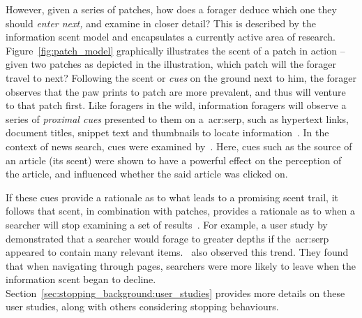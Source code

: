 However, given a series of patches, how does a forager deduce which one they should \emph{enter next,} and examine in closer detail? This is described by the information scent model and encapsulates a currently active area of research. Figure~\ref{fig:patch_model} graphically illustrates the scent of a patch in action -- given two patches as depicted in the illustration, which patch will the forager travel to next? Following the scent or \emph{cues} on the ground next to him, the forager observes that the paw prints to patch  are more prevalent, and thus will venture to that patch first. Like foragers in the wild, information foragers will observe a series of \emph{proximal cues} presented to them on a~\gls{acr:serp}, such as hypertext links, document titles, snippet text and thumbnails to locate information~\citep{pirolli1995ift, pirolli1999ift, chi2001information_scent, oltston2003scenttrails, pirolli2007ift}. In the context of news search, cues were examined by~\cite{sundar2007news_scent}. Here, cues such as the source of an article (its scent) were shown to have a powerful effect on the perception of the article, and influenced whether the said article was clicked on.

If these cues provide a rationale as to what leads to a promising scent trail, it follows that scent, in combination with patches, provides a rationale as to when a searcher will stop examining a set of results~\citep{pirolli1999ift, wu2012dc, wu2014information_scent}. For example, a user study by~\cite{wu2014information_scent} demonstrated that a searcher would forage to greater depths if the~\gls{acr:serp} appeared to contain many relevant items.~\cite{card2001scent_graphs} also observed this trend. They found that when navigating through pages, searchers were more likely to leave when the information scent began to decline. Section~\ref{sec:stopping_background:user_studies} provides more details on these user studies, along with others considering stopping behaviours.

